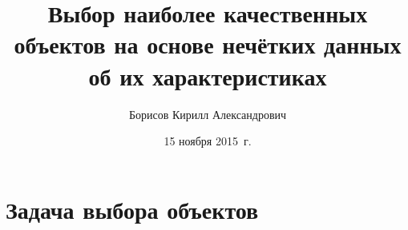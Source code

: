 


\title[Выбор объектов по экспертным оценкам]{Выбор наиболее качественных объектов на основе нечётких данных об их характеристиках}
\author{Борисов Кирилл Александрович}
\date{15 ноября 2015~г.}


\sloppy

\maketitle

\section{Задача выбора объектов}


